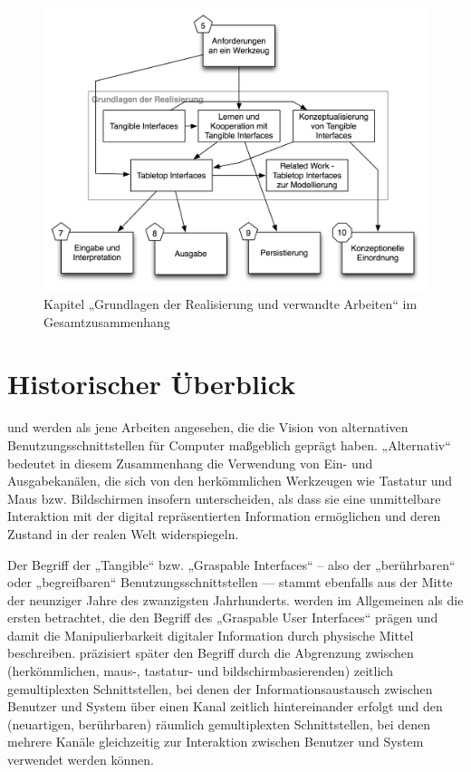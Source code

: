 \begin{figure}[htbp]
	\centering
		\includegraphics[scale=0.6]{img/Kontextgrafiken/k6.png}
	\caption{Kapitel „Grundlagen der Realisierung und verwandte Arbeiten“ im Gesamtzusammenhang}
	\label{fig:img_Kontextgrafiken_k6}
\end{figure}

\section{Historischer Überblick} %
\label{sec:entwicklung_tangible_interfaces}

\citet{Wellner93a} und \citet{Suzuki95} werden als jene Arbeiten angesehen, die die Vision von alternativen Benutzungsschnittstellen für Computer maßgeblich geprägt haben. „Alternativ“ bedeutet in diesem Zusammenhang die Verwendung von Ein- und Ausgabekanälen, die sich von den herkömmlichen Werkzeugen wie Tastatur und Maus bzw. Bildschirmen insofern unterscheiden, als dass sie eine unmittelbare Interaktion mit der digital repräsentierten Information ermöglichen und deren Zustand in der realen Welt widerspiegeln.

Der Begriff der „Tangible“ bzw. „Graspable Interfaces“ – also der „berührbaren“ oder „begreifbaren“ Benutzungsschnittstellen — stammt ebenfalls aus der Mitte der neunziger Jahre des zwanzigsten Jahrhunderts. \citet{Fitzmaurice95} werden im Allgemeinen als die ersten betrachtet, die den Begriff des „Graspable User Interfaces“ prägen und damit die Manipulierbarkeit digitaler Information durch physische Mittel beschreiben. \citet{Fitzmaurice96} präzisiert später den Begriff durch die Abgrenzung zwischen (herkömmlichen, maus-, tastatur- und bildschirmbasierenden) zeitlich gemultiplexten Schnittstellen, bei denen der Informationsaustausch zwischen Benutzer und System über einen Kanal zeitlich hintereinander erfolgt und den (neuartigen, berührbaren) räumlich gemultiplexten Schnittstellen, bei denen mehrere Kanäle gleichzeitig zur Interaktion zwischen Benutzer und System verwendet werden können. 

